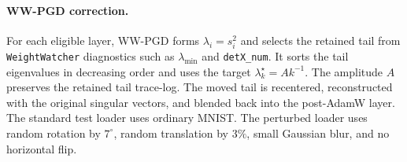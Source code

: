 \documentclass[10pt,twocolumn]{article}
\newcommand{\WW}{\texttt{WeightWatcher}}
\begin{document}
\paragraph{WW-PGD correction.}
For each eligible layer, WW-PGD forms $\lambda_i=s_i^2$ and selects the retained tail from \WW{} diagnostics such as $\lambda_{\min}$ and \texttt{detX\_num}. It sorts the tail eigenvalues in decreasing order and uses the target $\lambda_k^\star=A k^{-1}$. The amplitude $A$ preserves the retained tail trace-log. The moved tail is recentered, reconstructed with the original singular vectors, and blended back into the post-AdamW layer. The standard test loader uses ordinary MNIST. The perturbed loader uses random rotation by $7^\circ$, random translation by $3\%$, small Gaussian blur, and no horizontal flip.

\clearpage
\twocolumn
\end{document}
